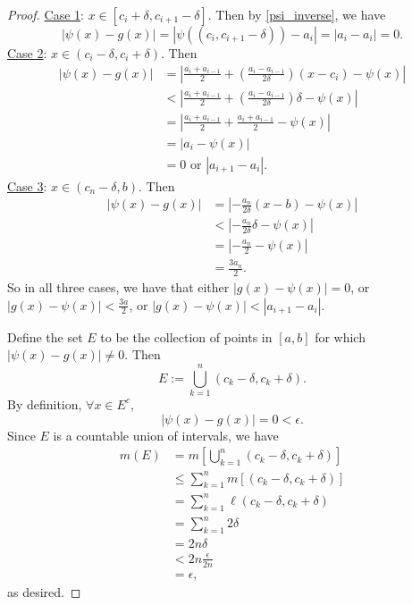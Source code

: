 \documentclass{article}
\begin{document}
\begin{proof}
	\underline{Case 1}: $x \in [c_i + \delta, c_{i+1} - \delta]$. Then by \eqref{psi_inverse}, we have
	\begin{equation}
		|\psi(x) - g(x)| = |\psi\left((c_i, c_{i+1}-\delta)\right) - a_i| = |a_i - a_i| = 0.
	\end{equation}
	\underline{Case 2}: $x \in (c_i - \delta, c_i + \delta)$. Then
	\begin{align}
		|\psi(x) - g(x)| &= \left|\frac{a_i + a_{i-1}}{2} + \left(\frac{a_i - a_{i-1}}{2\delta}\right)(x-c_i) - \psi(x)\right| \\
		&< \left|\frac{a_i + a_{i-1}}{2} + \left(\frac{a_i - a_{i-1}}{2\delta}\right)\delta - \psi(x)\right| \\
		&= \left|\frac{a_i + a_{i-1}}{2} + \frac{a_i + a_{i-1}}{2} - \psi(x)\right| \\
		&= |a_i - \psi(x)| \\
		&= 0 \textrm{ or } |a_{i+1} - a_i|.
	\end{align}
	\underline{Case 3}: $x \in (c_n - \delta, b)$. Then
	\begin{align}
		|\psi(x) - g(x)| &= \left|-\frac{a_n}{2\delta}(x-b) - \psi(x)\right| \\
		&< \left|-\frac{a_n}{2\delta}\delta - \psi(x)\right| \\
		&= \left|-\frac{a_n}{2} - \psi(x)\right| \\
		&= \frac{3a_n}{2}.
	\end{align}
	So in all three cases, we have that either $|g(x) - \psi(x)| = 0$, or $|g(x) - \psi(x)| < \frac{3a}{2}$, or $|g(x) - \psi(x)|< |a_{i+1} - a_i|$.
	
	Define the set $E$ to be the collection of points in $[a, b]$ for which $|\psi(x) - g(x)| \neq 0$. Then
	\begin{equation}
		E := \bigcup_{k=1}^{n} (c_k - \delta, c_k + \delta).
	\end{equation}
	By definition, $\forall x \in E^c$, 
	\begin{equation}
		|\psi(x) - g(x)| = 0 < \epsilon.
	\end{equation}
	Since $E$ is a countable union of intervals, we have
	\begin{align}
		m(E) &= m\left[\bigcup_{k=1}^n (c_k - \delta, c_k + \delta)\right] \\
		&\leq \sum_{k=1}^n m\left[(c_k - \delta, c_k + \delta)\right] \\
		&= \sum_{k=1}^n \ell (c_k - \delta, c_k + \delta) \\
		&= \sum_{k=1}^n 2\delta\\
		&= 2n\delta \\
		& < 2n \frac{\epsilon}{2n} \\
		&= \epsilon,
	\end{align}
	as desired.
\end{proof}
	
\end{document}
